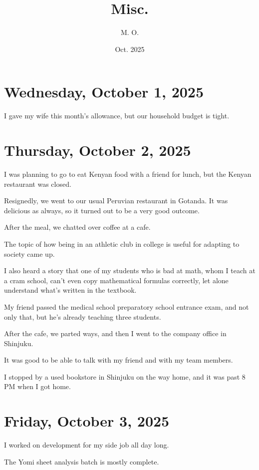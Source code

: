 \documentclass[uplatex]{jsarticle}
\title{
Misc.
}
\author{
M. O.
}
\date{Oct. 2025}
\begin{document}
\maketitle

\section{Wednesday, October 1, 2025}

I gave my wife this month's allowance, but our household budget is tight.



\section{Thursday, October 2, 2025}

I was planning to go to eat Kenyan food with a friend for lunch, but the Kenyan restaurant was closed.

Resignedly, we went to our usual Peruvian restaurant in Gotanda. It was delicious as always, so it turned out to be a very good outcome.

After the meal, we chatted over coffee at a cafe.

The topic of how being in an athletic club in college is useful for adapting to society came up.

I also heard a story that one of my students who is bad at math, whom I teach at a cram school, can't even copy mathematical formulas correctly, let alone understand what's written in the textbook.

My friend passed the medical school preparatory school entrance exam, and not only that, but he's already teaching three students.

After the cafe, we parted ways, and then I went to the company office in Shinjuku.

It was good to be able to talk with my friend and with my team members.

I stopped by a used bookstore in Shinjuku on the way home, and it was past 8 PM when I got home.



\section{Friday, October 3, 2025}

I worked on development for my side job all day long.

The Yomi sheet analysis batch is mostly complete.
\end{document}
